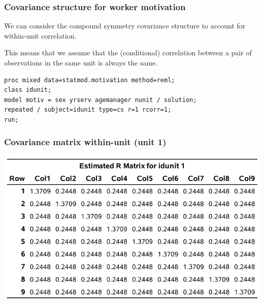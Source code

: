 \documentclass{beamer}
\begin{document}
\begin{frame}[fragile]
\frametitle{Covariance structure for worker motivation}
\bi
\item We can consider the compound symmetry covariance structure to account for within-unit correlation. 
\bi

\item This means that we assume that the (conditional) correlation between a pair of observations in the same unit is always the same.
\ei
   
 \begin{tcolorbox}[colback=white, colframe=hecblue, title=\SASlang{} code for a linear model with equicorrelated errors]
 \begin{small}
\begin{verbatim}
proc mixed data=statmod.motivation method=reml; 
class idunit; 
model motiv = sex yrserv agemanager nunit / solution; 
repeated / subject=idunit type=cs r=1 rcorr=1; 
run;
\end{verbatim}
\end{small}
\end{tcolorbox}
\ei
\end{frame}
% 

 \begin{frame}
\frametitle{Covariance matrix within-unit (unit 1)}
\begin{center}
\includegraphics[width = 0.85\linewidth]{img/c6/slides7-e07}

\end{center}
\end{frame}
\end{document}
